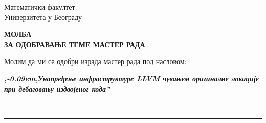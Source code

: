 \documentclass[a4paper]{article}
\def\zn{,\kern-0.09em,}
\begin{document}
\thispagestyle{empty}

\begin{flushleft}
Математички факултет\\
Универзитета у Београду
\end{flushleft}

\bigskip

\begin{center}
\textbf{МОЛБА\\
ЗА ОДОБРАВАЊЕ ТЕМЕ МАСТЕР РАДА
}\end{center}

\bigskip

\begin{flushleft}
Молим да ми се одобри израда мастер рада под насловом:
\end{flushleft}

\begin{minipage}{16.5cm}
\textbf{\textit{\zn Унапређење инфраструктуре LLVM чувањем оригиналне локације при дебаговању издвојеног кода''}}
\end{minipage}\\
\rule[4mm]{17.5cm}{.05mm}
\end{document}
